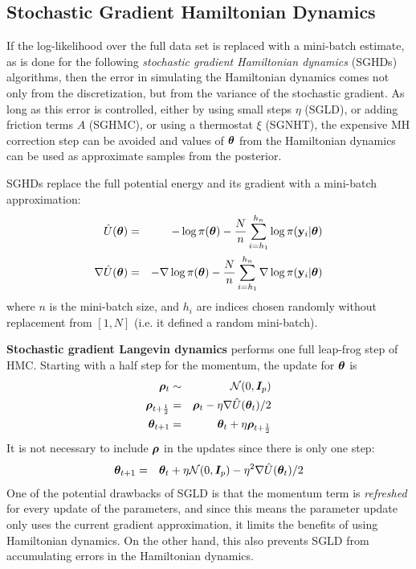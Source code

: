 \documentclass[]{article}
\begin{document}
\subsection{Stochastic Gradient Hamiltonian Dynamics}\label{se:sghd}
If the log-likelihood over the full data set is replaced with a mini-batch estimate, as is done for the following {\em stochastic gradient Hamiltonian dynamics} (SGHDs) algorithms, then the error in simulating the Hamiltonian dynamics comes not only from the discretization, but from the variance of the stochastic gradient.  As long as this error is controlled, either by using small steps $\eta$ (SGLD), or adding friction terms $A$ (SGHMC), or using a thermostat $\xi$ (SGNHT), the expensive MH correction step can be avoided and values of ${\bm \theta}$ from the Hamiltonian dynamics can be used as approximate samples from the posterior.

SGHDs replace the full potential energy and its gradient with a mini-batch approximation:
\begin{eqnarray}
  \hat{U}({\bm \theta})       & = & - \log \pi({\bm \theta}) - \frac{N}{n} \sum_{i=h_1}^{h_n} \log \pi({\bf y}_i | {\bm \theta} ) \\
  \nabla\hat{U}({\bm \theta}) & = & - \nabla \log \pi({\bm \theta}) - \frac{N}{n} \sum_{i=h_1}^{h_n} \nabla \log \pi({\bf y}_i | {\bm \theta} ) 
\end{eqnarray} 
where $n$ is the mini-batch size, and $h_i$ are indices chosen randomly without replacement from $[1,N]$ (i.e. it defined a random mini-batch).  
 
{\bf Stochastic gradient Langevin dynamics} \cite{welling2011bayesian} performs one full leap-frog step of HMC.   Starting with a half step for the momentum, the update for ${\bm \theta}$ is 
\begin{eqnarray}
  {\bm \rho}_t & \sim & \mathcal{N}(0,{\bm I}_p) \\
  {\bm \rho}_{t+\frac{1}{2}} & = & {\bm \rho}_t - \eta \nabla \hat{U}({\bm \theta}_t) /2 \\
  {\bm \theta}_{t+1} & = & {\bm \theta}_t + \eta {\bm \rho}_{t+\frac{1}{2}}
\end{eqnarray}
It is not necessary to include ${\bm \rho}$ in the updates since there is only one step:
\begin{eqnarray}
  {\bm \theta}_{t+1} & = & {\bm \theta}_t + \eta \mathcal{N}(0,{\bm I}_p) - \eta^2 \nabla \hat{U}({\bm \theta}_t) /2 
\end{eqnarray}
One of the potential drawbacks of SGLD is that the momentum term is {\em refreshed} for every update of the parameters, and since this means the parameter update only uses the current gradient approximation, it limits the benefits of using Hamiltonian dynamics.  On the other hand, this also prevents SGLD from accumulating errors in the Hamiltonian dynamics.
\end{document}
